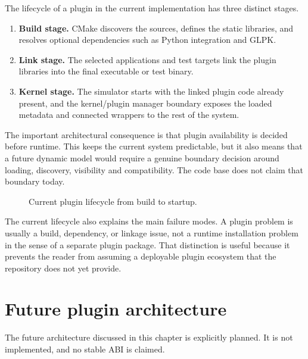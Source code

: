 The lifecycle of a plugin in the current implementation has three distinct
stages.

\begin{enumerate}
 \item \textbf{Build stage.} CMake discovers the sources, defines the static
   libraries, and resolves optional dependencies such as Python integration and
   GLPK.
 \item \textbf{Link stage.} The selected applications and test targets link
   the plugin libraries into the final executable or test binary.
 \item \textbf{Kernel stage.} The simulator starts with the linked plugin code
   already present, and the kernel/plugin manager boundary exposes the loaded
   metadata and connected wrappers to the rest of the system.
\end{enumerate}

The important architectural consequence is that plugin availability is
decided before runtime. This keeps the current system predictable, but it also
means that a future dynamic model would require a genuine boundary decision
around loading, discovery, visibility and compatibility. The code base does
not claim that boundary today.

\begin{figure}[htbp]
\caption{Current plugin lifecycle from build to startup.}
\label{fig:plugin-current-lifecycle}
\end{figure}

The current lifecycle also explains the main failure modes. A plugin problem is
usually a build, dependency, or linkage issue, not a runtime installation
problem in the sense of a separate plugin package. That distinction is useful
because it prevents the reader from assuming a deployable plugin ecosystem
that the repository does not yet provide.

\section{Future plugin architecture}
\label{sec:plugin-future-architecture}

The future architecture discussed in this chapter is explicitly planned. It is
not implemented, and no stable ABI is claimed.

